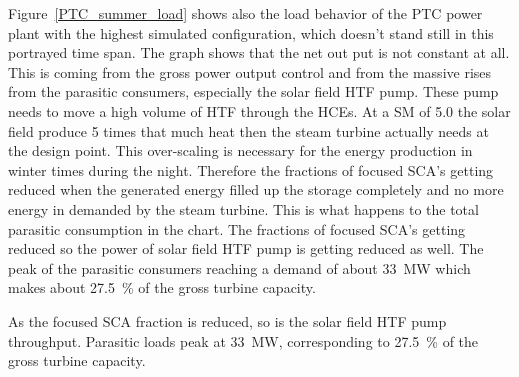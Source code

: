 Figure~\ref{PTC_summer_load} shows also the load behavior of the PTC power plant with the highest simulated configuration, which doesn't stand still in this portrayed time span. The graph shows that the net out put is not constant at all. This is coming from the gross power output control and from the massive rises from the parasitic consumers, especially the solar field HTF pump. These pump needs to move a high volume of HTF through the HCEs. At a SM of 5.0 the solar field produce 5 times that much heat then the steam turbine actually needs at the design point. This over-scaling is necessary for the energy production in winter times during the night. Therefore the fractions of focused SCA's getting reduced when the generated energy filled up the storage completely and no more energy in demanded by the steam turbine. This is what  happens to the total parasitic consumption in the chart. The fractions of focused SCA's getting reduced so the power of solar field HTF pump is getting reduced as well. The peak of the parasitic consumers reaching a demand of about \SI{33}{MW} which makes about 27.5~\% of the gross turbine capacity.



As the focused SCA fraction is reduced, so is the solar field HTF pump throughput. Parasitic loads peak at \SI{33}{MW}, corresponding to \SI{27.5}{\percent} of the gross turbine capacity.


